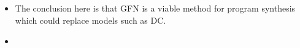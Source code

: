 \subsection{}
\begin{itemize}
    \item The conclusion here is that GFN is a viable method for program synthesis which could replace models such as DC. 
    \item 
\end{itemize}






























